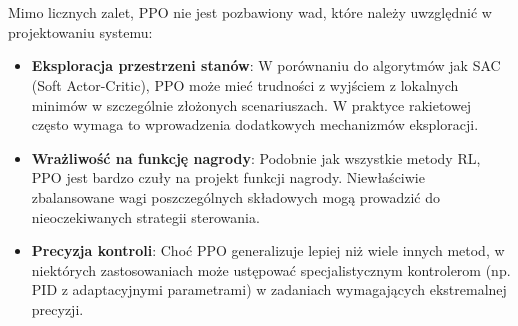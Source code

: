 %
%
%
%

\paragraph{}\\
Mimo licznych zalet, PPO nie jest pozbawiony wad, które należy uwzględnić w projektowaniu systemu:

\begin{itemize}
    \item \textbf{Eksploracja przestrzeni stanów}: W porównaniu do algorytmów jak SAC (Soft Actor-Critic), PPO może mieć trudności z wyjściem z lokalnych minimów w szczególnie złożonych scenariuszach. W praktyce rakietowej często wymaga to wprowadzenia dodatkowych mechanizmów eksploracji.

    \item \textbf{Wrażliwość na funkcję nagrody}: Podobnie jak wszystkie metody RL, PPO jest bardzo czuły na projekt funkcji nagrody. Niewłaściwie zbalansowane wagi poszczególnych składowych mogą prowadzić do nieoczekiwanych strategii sterowania.

    \item \textbf{Precyzja kontroli}: Choć PPO generalizuje lepiej niż wiele innych metod, w niektórych zastosowaniach może ustępować specjalistycznym kontrolerom (np. PID z adaptacyjnymi parametrami) w zadaniach wymagających ekstremalnej precyzji.
\end{itemize}




